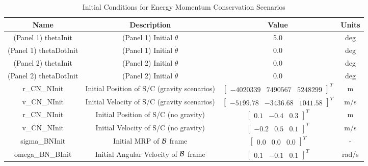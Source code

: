 \begin{table}[htbp]
	\caption{Initial Conditions for Energy Momentum Conservation Scenarios}
	\label{tab:initial}
	\centering \fontsize{10}{10}\selectfont
	\begin{tabular}{| c | c | c | c |} %
		\hline
		\textbf{Name}  & \textbf{Description}  & \textbf{Value} & \textbf{Units} \\
		\hline
		(Panel 1) thetaInit  & (Panel 1) Initial $\theta$ & 5.0 & deg \\
		\hline
		(Panel 1) thetaDotInit  & (Panel 1) Initial $\dot{\theta}$ & 0.0 & deg \\
		\hline
(Panel 2) thetaInit  & (Panel 2) Initial $\theta$ & 0.0 & deg \\
\hline
(Panel 2) thetaDotInit  & (Panel 2) Initial $\dot{\theta}$ & 0.0 & deg \\
\hline
		r\_CN\_NInit & Initial Position of S/C (gravity scenarios) & $\begin{bmatrix}
			-4020339 &	7490567 & 5248299 
		\end{bmatrix}^T$ & m \\
		\hline
		v\_CN\_NInit & Initial Velocity of S/C (gravity scenarios) & $\begin{bmatrix}
		-5199.78 & -3436.68 & 1041.58
\end{bmatrix}^T$ & m/s \\
\hline
		r\_CN\_NInit & Initial Position of S/C (no gravity) & $\begin{bmatrix}
0.1 & -0.4 & 0.3 
\end{bmatrix}^T$ & m \\
\hline
v\_CN\_NInit & Initial Velocity of S/C (no gravity) & $\begin{bmatrix}
-0.2 & 0.5 & 0.1
\end{bmatrix}^T$ & m/s \\
\hline
		sigma\_BNInit & Initial MRP of $\cal{B}$ frame & $\begin{bmatrix}
0.0 & 0.0 & 0.0
\end{bmatrix}^T$ & - \\
\hline
omega\_BN\_BInit & Initial Angular Velocity of $\cal{B}$ frame & $\begin{bmatrix}
0.1 & -0.1 & 0.1
\end{bmatrix}^T$ & rad/s \\
\hline
	\end{tabular}
\end{table}

